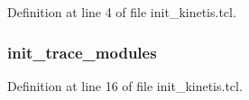 Definition at line 4 of file init\+\_\+kinetis.\+tcl.

\subsubsection[{\texorpdfstring{init\+\_\+trace\+\_\+modules}{init_trace_modules}}]{\setlength{\rightskip}{0pt plus 5cm}init\+\_\+trace\+\_\+modules}\hypertarget{init__kinetis_8tcl_a8ecf61d10da6f21c5b31426f9a235e03}{}\label{init__kinetis_8tcl_a8ecf61d10da6f21c5b31426f9a235e03}


Definition at line 16 of file init\+\_\+kinetis.\+tcl.

